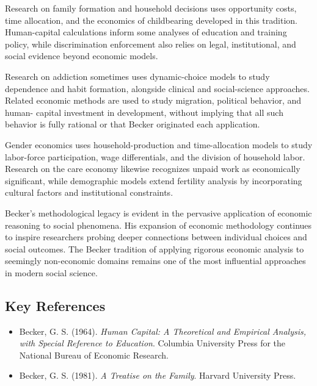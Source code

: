 Research on family formation and household decisions uses opportunity costs,
time allocation, and the economics of childbearing developed in this tradition.
Human-capital calculations inform some analyses of education and training
policy, while discrimination enforcement also relies on legal, institutional,
and social evidence beyond economic models.

Research on addiction sometimes uses dynamic-choice models to study dependence
and habit formation, alongside clinical and social-science approaches. Related
economic methods are used to study migration, political behavior, and human-
capital investment in development, without implying that all such behavior is
fully rational or that Becker originated each application.

Gender economics uses household-production and time-allocation models to study
labor-force participation, wage differentials, and the division of household
labor. Research on the care economy likewise recognizes unpaid work as
economically significant, while demographic models extend fertility analysis by
incorporating cultural factors and institutional constraints.

Becker's methodological legacy is evident in the pervasive application of
economic reasoning to social phenomena. His expansion of economic methodology
continues to inspire researchers probing deeper connections between individual
choices and social outcomes. The Becker tradition of applying rigorous economic
analysis to seemingly non-economic domains remains one of the most influential
approaches in modern social science.

\subsection*{Key References}
\begin{itemize}
    \item Becker, G. S. (1964). \textit{Human Capital: A Theoretical and Empirical Analysis, with Special Reference to Education}. Columbia University Press for the National Bureau of Economic Research.
    \item Becker, G. S. (1981). \textit{A Treatise on the Family}. Harvard University Press.
\end{itemize}
